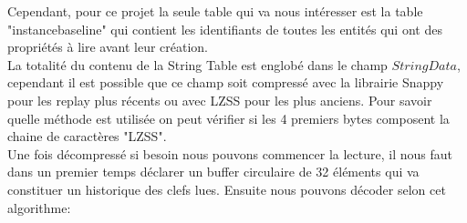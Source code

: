\documentclass{article}
\begin{document}
Cependant, pour ce projet la seule table qui va nous intéresser est la table "instancebaseline" qui contient les identifiants de toutes les entités qui ont des propriétés à lire avant leur création.\\

La totalité du contenu de la String Table est englobé dans le champ $StringData$, cependant il est possible que ce champ soit compressé avec la librairie Snappy pour les replay plus récents ou avec LZSS pour les plus anciens. Pour savoir quelle méthode est utilisée on peut vérifier si les 4 premiers bytes composent la chaine de caractères "LZSS".\\
Une fois décompressé si besoin nous pouvons commencer la lecture, il nous faut dans un premier temps déclarer un buffer circulaire de 32 éléments qui va constituer un historique des clefs lues. Ensuite nous pouvons décoder selon cet algorithme:\\
\end{document}
